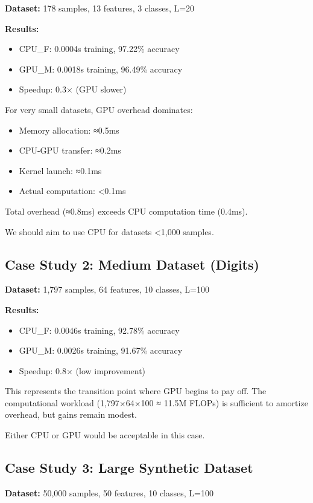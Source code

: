 \documentclass[conference]{IEEEtran}
\begin{document}
\textbf{Dataset:} 178 samples, 13 features, 3 classes, L=20

\textbf{Results:}
\begin{itemize}
\item CPU\_F: 0.0004s training, 97.22\% accuracy
\item GPU\_M: 0.0018s training, 96.49\% accuracy
\item Speedup: 0.3× (GPU slower)
\end{itemize}

For very small datasets, GPU overhead dominates:
\begin{itemize}
\item Memory allocation: ≈0.5ms
\item CPU-GPU transfer: ≈0.2ms
\item Kernel launch: ≈0.1ms
\item Actual computation: \textless 0.1ms
\end{itemize}

Total overhead (≈0.8ms) exceeds CPU computation time (0.4ms).

We should aim to use CPU for datasets \textless 1,000 samples.

\subsection{Case Study 2: Medium Dataset (Digits)}

\textbf{Dataset:} 1,797 samples, 64 features, 10 classes, L=100

\textbf{Results:}
\begin{itemize}
\item CPU\_F: 0.0046s training, 92.78\% accuracy
\item GPU\_M: 0.0026s training, 91.67\% accuracy  
\item Speedup: 0.8× (low improvement)
\end{itemize}

This represents the transition point where GPU begins to pay off. The computational workload (1,797×64×100 ≈ 11.5M FLOPs) is sufficient to amortize overhead, but gains remain modest.

Either CPU or GPU would be acceptable in this case.

\subsection{Case Study 3: Large Synthetic Dataset}

\textbf{Dataset:} 50,000 samples, 50 features, 10 classes, L=100
\end{document}
